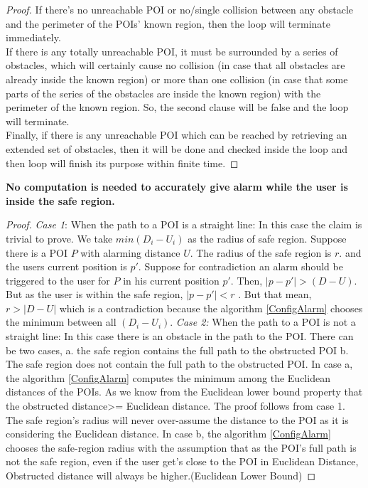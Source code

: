 \documentclass{sig-alternate}
\begin{document}
\begin{proof}
If there's no unreachable POI or no/single collision between any obstacle and the perimeter of the POIs' known region, then the loop will terminate immediately.
\\If there is any totally unreachable POI, it must be surrounded by a series of obstacles, which will certainly cause no collision (in case that all obstacles are already inside the known region) or more than one collision (in case that some parts of the series of the obstacles are inside the known region) with the perimeter of the known region. So, the second clause will be false and the loop will terminate.
\\Finally, if there is any unreachable POI which can be reached by retrieving an extended set of obstacles, then it will be done and checked inside the loop and then loop will finish its purpose within finite time.
\end{proof}

\textbf{No computation is needed to accurately give alarm while the user is inside the safe region.}\\

\begin{proof}
\textit{Case 1}: When the path to a POI is a straight line: 
In this case the claim is trivial to prove. We take $min( D_i - U_i )$ as the radius of safe region. Suppose there is a POI $P$ with alarming distance $U$. The radius of the safe region is $r$. and the users current position is $p'$. Suppose for contradiction an alarm should be triggered to the user for $P$ in his current position $p'$. Then, $|p-p'|>(D-U)$. But as the user is within the safe region, $|p-p'|<r$ . But that mean, $r>|D-U|$ which is a contradiction because the algorithm \ref{ConfigAlarm} chooses the minimum between all $(D_i - U_i )$.
\textit{Case 2:} When the path to a POI is not a straight line: 
In this case there is an obstacle in the path to the POI. There can be two cases, 
a. the safe region contains the full path to the obstructed POI 
b. The safe region does not contain the full path to the obstructed POI.
In case a, the algorithm \ref{ConfigAlarm} computes the minimum among the Euclidean distances of the POIs. As we know from the Euclidean lower bound property that the obstructed distance>= Euclidean distance. The proof follows from case 1. The safe region's radius will never over-assume the distance to the POI as it is considering the Euclidean distance.
In case b, the algorithm \ref{ConfigAlarm} chooses the safe-region radius with the assumption that as the POI's full path is not the safe region, even if the user get's close to the POI in Euclidean Distance, Obstructed distance will always be higher.(Euclidean Lower Bound)
\end{proof}
\end{document}
